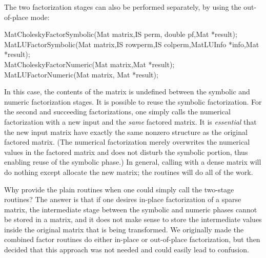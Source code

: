 {{{The 
two  
factorization 
stages  
can also be performed separately, by using the out-of-place mode:
\begin{tabbing}
  MatCholeskyFactorSymbolic(Mat matrix,IS perm, double pf,Mat *result);\\
  MatLUFactorSymbolic(Mat matrix,IS rowperm,IS colperm,MatLUInfo *info,Mat *result);\\
  MatCholeskyFactorNumeric(Mat matrix,Mat *result);\\
  MatLUFactorNumeric(Mat matrix, Mat *result);
\end{tabbing}
In this case, the contents of the matrix  is undefined between 
the symbolic and numeric factorization stages. 
It is possible to reuse the symbolic factorization. For the second and 
succeeding factorizations, one simply calls the numerical factorization with a 
new input  and the {\em same} factored  matrix.
It is {\em essential} that the new input matrix 
have   %
exactly the same nonzero structure as the original factored matrix.
(The numerical factorization merely overwrites the numerical values in the 
factored matrix and does not disturb the symbolic portion, thus enabling
reuse of the symbolic phase.)
In general, calling  with a dense matrix will 
do nothing except allocate the new matrix; the  
routines will do all of the work. 

Why provide the plain  routines when one could simply 
call the two-stage routines? The answer is that if one desires in-place 
factorization of a sparse matrix, the intermediate stage between the 
symbolic and numeric phases cannot be stored in a  matrix, and
it does not make sense to store the intermediate values
inside the original matrix 
that is being transformed.  We originally made the combined factor routines
do either in-place or out-of-place factorization, but then decided that 
this approach was not needed and could easily lead to confusion.

}}}
